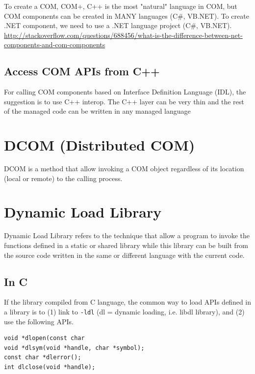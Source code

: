 To create a COM, COM+, C++ is the most "natural" language in COM, but COM
components can be created in MANY languages (C\#, VB.NET). To create .NET
component, we need to use a .NET language project (C\#, VB.NET). 
\url{http://stackoverflow.com/questions/688456/what-is-the-difference-between-net-components-and-com-components}

\subsection{Access COM APIs from C++}

For calling COM components based on Interface Definition Language (IDL), the
suggestion is to use C++ interop. The C++ layer can be very thin and the rest of
the managed code can be written in any managed language 


\section{DCOM (Distributed COM)}
\label{sec:DCOM}


DCOM is a method that allow invoking a COM object regardless of its location (local or remote) to the calling process.



\section{Dynamic Load Library}
\label{sec:dynamic-load-library}

Dynamic Load Library refers to the technique that allow a program to
invoke the functions defined in a static or shared library while this
library can be built from the source code written in the same or
different language with the current code.

\subsection{In C}
\label{sec:dynamic-load-library-in-c}
\label{sec:dlopen}

If the library compiled from C language, the common way to load APIs defined in
a library is to (1) link to \verb!-ldl! (dl = dynamic loading, i.e. libdl
library), and (2) use the following APIs.
\begin{verbatim}
void *dlopen(const char
void *dlsym(void *handle, char *symbol);
const char *dlerror();
int dlclose(void *handle);
\end{verbatim}

